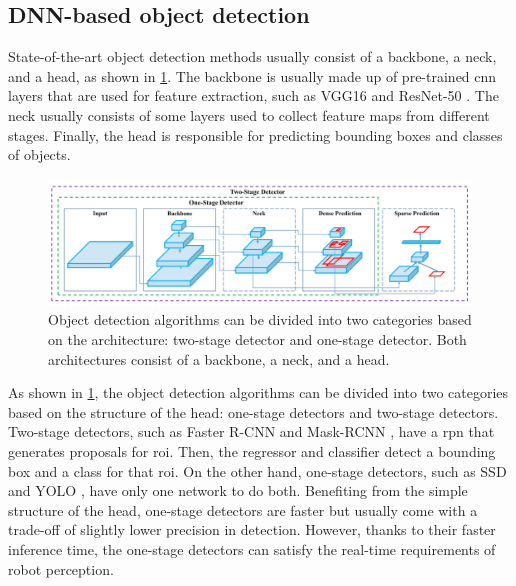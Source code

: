 \subsection{DNN-based object detection}

State-of-the-art object detection methods usually consist of a backbone, a neck, and a head, as shown in \cref{fig:object_detector}. The backbone is usually made up of pre-trained \gls{cnn} layers that are used for feature extraction, such as VGG16 \cite{Simonyan2015} and ResNet-50 \cite{He2016}. The neck usually consists of some layers used to collect feature maps from different stages. Finally, the head is responsible for predicting bounding boxes and classes of objects. 

\begin{figure}
    \centering
    \includegraphics[width=\linewidth]{figures/background/object_detector.png}
    \caption[Architecture of object detection algorithms]{Object detection algorithms can be divided into two categories based on the architecture: two-stage detector and one-stage detector. Both architectures consist of a backbone, a neck, and a head. \cite{Bochkovskiy2020}}
    \label{fig:object_detector}
\end{figure}

As shown in \cref{fig:object_detector}, the object detection algorithms can be divided into two categories based on the structure of the head: one-stage detectors and two-stage detectors. Two-stage detectors, such as Faster R-CNN \cite{Ren2015} and Mask-RCNN \cite{He2017}, have a \gls{rpn} that generates proposals for \gls{roi}. Then, the regressor and classifier detect a bounding box and a class for that \gls{roi}. On the other hand, one-stage detectors, such as SSD \cite{Liu2016} and YOLO \cite{Redmon2016}, have only one network to do both. Benefiting from the simple structure of the head, one-stage detectors are faster but usually come with a trade-off of slightly lower precision in detection. However, thanks to their faster inference time, the one-stage detectors can satisfy the real-time requirements of robot perception.

